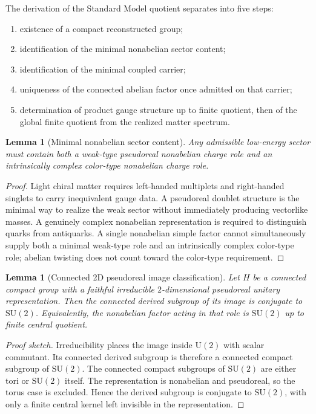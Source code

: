 \documentclass[11pt]{article}
\newtheorem{lemma}[theorem]{Lemma}
\newcommand{\SU}{\mathrm{SU}}
\newcommand{\U}{\mathrm{U}}
\begin{document}
The derivation of the Standard Model quotient separates into five steps:
\begin{enumerate}[leftmargin=2em]
\item existence of a compact reconstructed group;
\item identification of the minimal nonabelian sector content;
\item identification of the minimal coupled carrier;
\item uniqueness of the connected abelian factor once admitted on that carrier;
\item determination of product gauge structure up to finite quotient, then of the global finite quotient from the realized matter spectrum.
\end{enumerate}

\begin{lemma}[Minimal nonabelian sector content]\label{lem:mincontent}
Any admissible low-energy sector must contain both a weak-type pseudoreal nonabelian charge role and an intrinsically complex color-type nonabelian charge role.
\end{lemma}

\begin{proof}
Light chiral matter requires left-handed multiplets and right-handed singlets to carry inequivalent gauge data. A pseudoreal doublet structure is the minimal way to realize the weak sector without immediately producing vectorlike masses. A genuinely complex nonabelian representation is required to distinguish quarks from antiquarks. A single nonabelian simple factor cannot simultaneously supply both a minimal weak-type role and an intrinsically complex color-type role; abelian twisting does not count toward the color-type requirement.
\end{proof}

\begin{lemma}[Connected 2D pseudoreal image classification]\label{lem:su2class}
Let $H$ be a connected compact group with a faithful irreducible $2$-dimensional pseudoreal unitary representation. Then the connected derived subgroup of its image is conjugate to $\SU(2)$. Equivalently, the nonabelian factor acting in that role is $\SU(2)$ up to finite central quotient.
\end{lemma}

\begin{proof}[Proof sketch]
Irreducibility places the image inside $\U(2)$ with scalar commutant. Its connected derived subgroup is therefore a connected compact subgroup of $\SU(2)$. The connected compact subgroups of $\SU(2)$ are either tori or $\SU(2)$ itself. The representation is nonabelian and pseudoreal, so the torus case is excluded. Hence the derived subgroup is conjugate to $\SU(2)$, with only a finite central kernel left invisible in the representation.
\end{proof}
\end{document}
